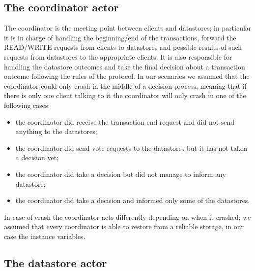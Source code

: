 \subsection{The coordinator actor}
The coordinator is the meeting point between clients and datastores; in particular it is in charge of handling the beginning/end of the transactions, forward the READ/WRITE requests from clients to datastores and possible results of such requests from datastores to the appropriate clients.
\newline
It is also responsible for handling the datastore outcomes and take the final decision about a transaction outcome following the rules of the protocol.
\newline
In our scenarios we assumed that the coordinator could only crash in the middle of a decision process, meaning that if there is only one client talking to it the coordinator will only crash in one of the following cases:
\begin{itemize}
    \item the coordinator did receive the transaction end request and did not send anything to the datastores;
    \item the coordinator did send vote requests to the datastores but it has not taken a decision yet;
    \item the coordinator did take a decision but did not manage to inform any datastore;
    \item the coordinator did take a decision and informed only some of the datastores.
\end{itemize}
In case of crash the coordinator acts differently depending on when it crashed; we assumed that every coordinator is able to restore from a reliable storage, in our case the instance variables.

\subsection{The datastore actor}

